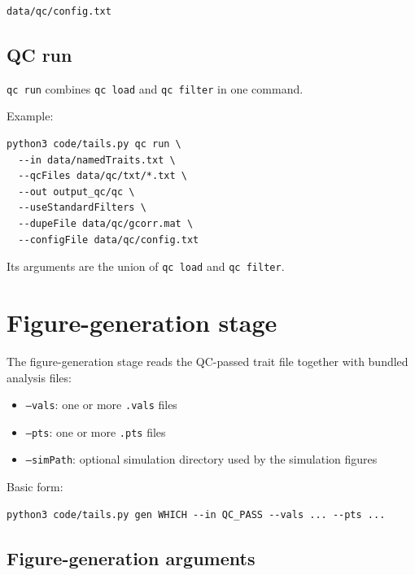 \documentclass[11pt]{article}
\begin{document}
\begin{verbatim}
data/qc/config.txt
\end{verbatim}

\subsection{QC run}

\texttt{qc run} combines \texttt{qc load} and \texttt{qc filter} in one command.

Example:

\begin{verbatim}
python3 code/tails.py qc run \
  --in data/namedTraits.txt \
  --qcFiles data/qc/txt/*.txt \
  --out output_qc/qc \
  --useStandardFilters \
  --dupeFile data/qc/gcorr.mat \
  --configFile data/qc/config.txt
\end{verbatim}

Its arguments are the union of \texttt{qc load} and \texttt{qc filter}.

\section{Figure-generation stage}

The figure-generation stage reads the QC-passed trait file together with bundled analysis files:

\begin{itemize}[nosep]
\item \texttt{--vals}: one or more \texttt{.vals} files
\item \texttt{--pts}: one or more \texttt{.pts} files
\item \texttt{--simPath}: optional simulation directory used by the simulation figures
\end{itemize}

Basic form:

\begin{verbatim}
python3 code/tails.py gen WHICH --in QC_PASS --vals ... --pts ...
\end{verbatim}

\subsection{Figure-generation arguments}
\end{document}
